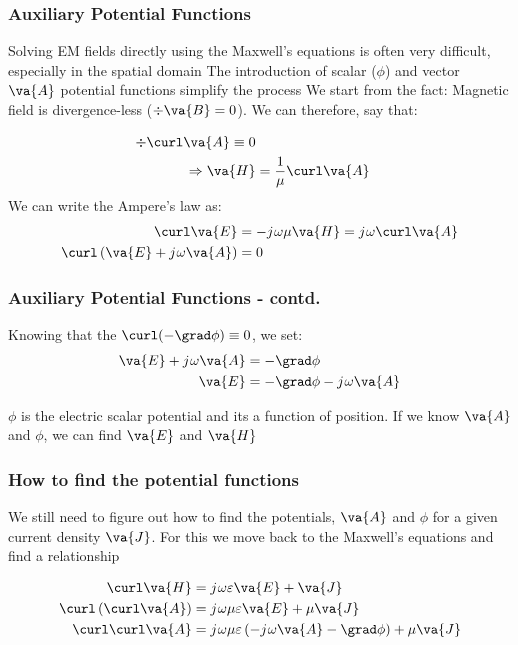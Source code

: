 \documentclass[10pt, compress]{beamer}
\renewcommand{\O}{\omega}  %
\newcommand{\E}{\varepsilon}  %
\renewcommand{\u}{\mu}  %
\renewcommand{\j}{{j}\mkern1mu} %
\begin{document}
\begin{frame}
  \frametitle{Auxiliary Potential Functions}
  \begin{outline}
    \1 Solving EM fields directly using the Maxwell's equations is often very difficult, especially in the spatial domain
    \1 The introduction of scalar (${\phi}$) and vector $\va{A}$ potential functions simplify the process
    \1 We start from the fact:
    \2 Magnetic field is divergence-less ($\div \va{B} = 0$). We can therefore, say that:
  \end{outline}
  \begin{align*}
    \div \curl \va{A} \equiv 0 \\
    \Rightarrow \va{H} &= \frac{1}{\u} \curl \va{A}
  \end{align*}
  We can write the Ampere's law as:
  \begin{align*}
    \curl \va{E} &= - \j \O \u \va{H} = \j \O \curl \va{A} \\
    \curl \left (\va{E} + \j \O \va{A} \right) &= 0
  \end{align*}
\end{frame}

\begin{frame}
  \frametitle{Auxiliary Potential Functions - contd.}
  Knowing that the $\curl (-\grad \phi) \equiv 0 $, we set:
  \begin{align*}
    \va{E} + \j \O \va{A} &= -\grad \phi \\
    \va{E} &= -\grad \phi - \j \O \va{A}
  \end{align*}
\begin{outline}
  \1 $\phi$ is the electric scalar potential and its a function of position.
  \1 If we know $\va{A}$ and $\phi$, we can find $\va{E}$ and $\va{H}$
\end{outline}
\end{frame}



\begin{frame}
  \frametitle{How to find the potential functions}

  \begin{outline}
    \1 We still need to figure out how to find the potentials,   $\va{A}$ and $\phi$ for a given current density $\va{J}$.
    \1 For this we move back to the Maxwell's equations and find a relationship
  \end{outline}

  \begin{align*}
     \curl \va{H} &= \j \O \E \va{E} + \va{J} \\
     \curl \left( \curl \va{A} \right) &= \j \O \u \E \va{E} + \u \va{J} \\
     \curl \curl \va{A} &= \j \O \u \E \left(-\j \O \va{A} - \grad \phi \right) + \u \va{J}
  \end{align*}
\end{frame}
\end{document}
